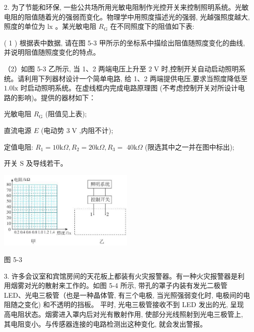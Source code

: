 \documentclass[10pt]{article}
\begin{document}
2. 为了节能和环保, 一些公共场所用光敏电阻制作光控开关来控制照明系统。光敏电阻的阻值随着光的强弱而变化。物理学中用照度描述光的强弱, 光越强照度越大, 照度的单位为 \(\mathrm{{lx}}\) 。某光敏电阻 \({R}_{\mathrm{G}}\) 在不同照度下的阻值如下表:

\begin{center}
\end{center}

( 1 ) 根据表中数据, 请在图 5-3 甲所示的坐标系中描绘出阻值随照度变化的曲线, 并说明阻值随照度变化的特点。

（2）如图 5-3 乙所示, 当 1、2 两端电压上升至 \(2\mathrm{\;V}\) 时,控制开关自动启动照明系统。请利用下列器材设计一个简单电路, 给 1、2 两端提供电压,要求当照度降低至 \({1.0}\mathrm{{lx}}\) 时启动照明系统。在虚线框内完成电路原理图 (不考虑控制开关对所设计电路的影响)。提供的器材如下：

光敏电阻 \({R}_{\mathrm{G}}\) (阻值见上表);

直流电源 \(E\) (电动势 \(3\mathrm{\;V}\) ,内阻不计);

定值电阻: \({R}_{1} = {10}\mathrm{k}\Omega ,{R}_{2} = {20}\mathrm{k}\Omega ,{R}_{3} =\) \({40}\mathrm{k}\Omega\) (限选其中之一并在图中标出);

开关 \(\mathrm{S}\) 及导线若干。

\begin{center}
\includegraphics[max width=0.5\textwidth]{images/01910e72-c5b7-7ed5-a6d4-fb3a5faefc32_114_959940.jpg}
\end{center}

图 5-3

3. 许多会议室和宾馆房间的天花板上都装有火灾报警器。有一种火灾报警器是利用烟雾对光的散射来工作的。如图 5-4 所示, 带孔的罩子内装有发光二极管 LED、光电三极管（也是一种晶体管, 有三个电极, 当光照强弱变化时, 电极间的电阻随之变化) 和不透明的挡板。 平时, 光电三极管接收不到 LED 发出的光, 呈现高电阻状态。烟雾进入罩内后对光有散射作用, 使部分光线照射到光电三极管上, 其电阻变小。与传感器连接的电路检测出这种变化, 就会发出警报。
\end{document}
